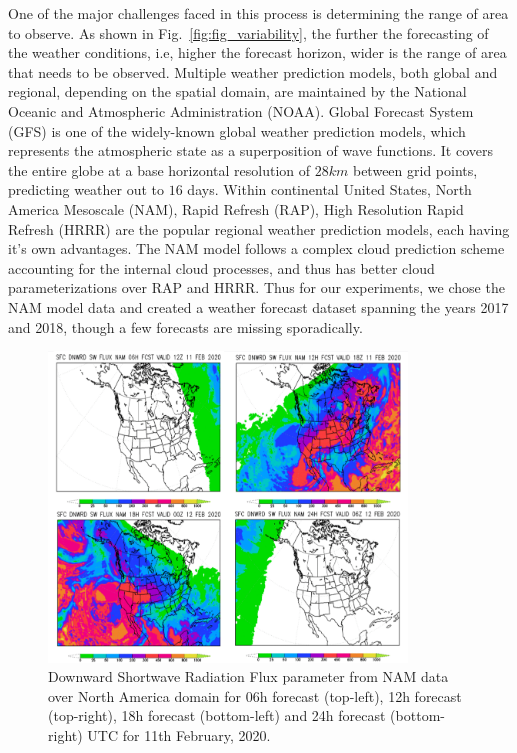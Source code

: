 \par One of the major challenges faced in this process is determining the range of area to observe. As shown in Fig.~\ref{fig:fig_variability}, the further the forecasting of the weather conditions, i.e, higher the forecast horizon, wider is the range of area that needs to be observed. Multiple weather prediction models, both global and regional, depending on the spatial domain, are maintained by the National Oceanic and Atmospheric Administration (NOAA). Global Forecast System (GFS) is one of the widely-known global weather prediction models, which represents the atmospheric state as a superposition of wave functions. It covers the entire globe at a base horizontal resolution of $28km$ between grid points, predicting weather out to $16$ days. Within continental United States, North America Mesoscale (NAM), Rapid Refresh (RAP), High Resolution Rapid Refresh (HRRR) are the popular regional weather prediction models, each having it's own advantages. The NAM model follows a complex cloud prediction scheme accounting for the internal cloud processes, and thus has better cloud parameterizations over RAP and HRRR. Thus for our experiments, we chose the NAM model data and created a weather forecast dataset spanning the years 2017 and 2018, though a few forecasts are missing sporadically.

\begin{figure}[ht]
    \begin{center}
    	\includegraphics[width=0.85\textwidth]{chapter3/fig_nam_dswrf.png}
    	\caption[Downward shortwave radiation flux parameter for 06h, 12h, 18h, 24h UTC forecasts in a day for NAM model data]{Downward Shortwave Radiation Flux parameter from NAM data over North America domain for 06h forecast (top-left), 12h forecast (top-right), 18h forecast (bottom-left) and 24h forecast (bottom-right) UTC for 11th February, 2020.}
    	\label{fig:fig_nam_dswrf}
    \end{center}
\end{figure}

